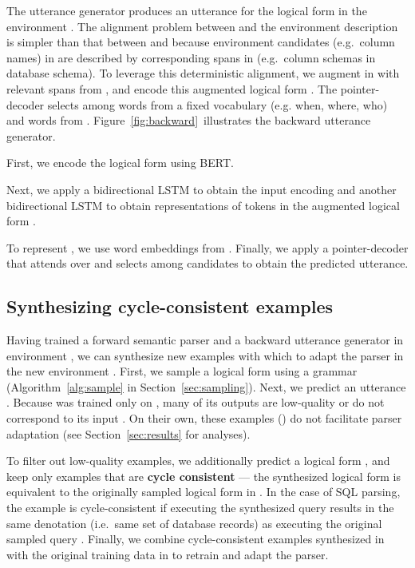 \documentclass[11pt,a4paper]{article}
\begin{document}
The utterance generator  produces an utterance  for the logical form  in the environment .
The alignment problem between  and the environment description  is simpler than that between  and  because environment candidates  (e.g.~column names) in  are described by corresponding spans in  (e.g.~column schemas in database schema).
To leverage this deterministic alignment, we augment  in  with relevant spans from , and encode this augmented logical form .
The pointer-decoder selects among words  from a fixed vocabulary (e.g. when, where, who) and words  from .
Figure~\ref{fig:backward}~illustrates the backward utterance generator.




First, we encode the logical form using BERT.

Next, we apply a bidirectional LSTM to obtain the input encoding  and another bidirectional LSTM to obtain representations of tokens in the augmented logical form .

To represent , we use word embeddings from .
Finally, we apply a pointer-decoder that attends over  and selects among candidates  to obtain the predicted utterance.


\subsection{Synthesizing cycle-consistent examples}
\label{sec:cycle}

Having trained a forward semantic parser  and a backward utterance generator  in environment , we can synthesize new examples with which to adapt the parser in the new environment .
First, we sample a logical form  using a grammar (Algorithm~\ref{alg:sample} in Section~\ref{sec:sampling}).
Next, we predict an utterance .
Because  was trained only on , many of its outputs are low-quality or do not correspond to its input .
On their own, these examples () do not facilitate parser adaptation (see Section~\ref{sec:results} for analyses).




To filter out low-quality examples, we additionally predict a logical form , and keep only examples that are \textbf{cycle consistent} --- the synthesized logical form  is equivalent to the originally sampled logical form  in .
In the case of SQL parsing, the example is cycle-consistent if executing the synthesized query  results in the same denotation (i.e.~same set of database records) as executing the original sampled query .
Finally, we combine cycle-consistent examples synthesized in  with the original training data in  to retrain and adapt the parser.
\end{document}
